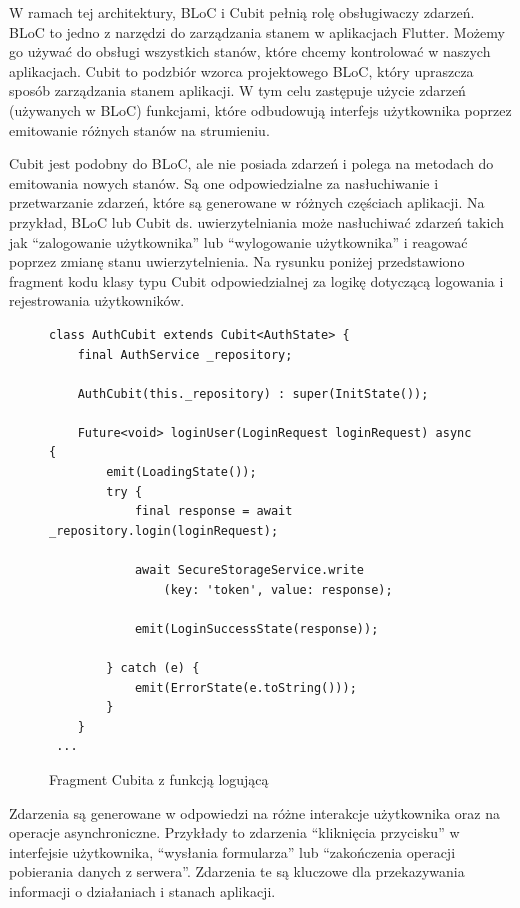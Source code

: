 \documentclass[a4paper,twoside,12pt]{book}
\begin{document}
W ramach tej architektury, BLoC i Cubit pełnią rolę obsługiwaczy zdarzeń.
BLoC to jedno z narzędzi do zarządzania stanem w aplikacjach Flutter. Możemy go używać do obsługi wszystkich stanów, które chcemy kontrolować w naszych aplikacjach. Cubit to podzbiór wzorca projektowego BLoC, który upraszcza sposób zarządzania stanem aplikacji. W tym celu zastępuje użycie zdarzeń (używanych w BLoC) funkcjami, które odbudowują interfejs użytkownika poprzez emitowanie różnych stanów na strumieniu.

Cubit jest podobny do BLoC, ale nie posiada zdarzeń i polega na metodach do emitowania nowych stanów. Są one odpowiedzialne za nasłuchiwanie i przetwarzanie zdarzeń, które są generowane w różnych częściach aplikacji. Na przykład, BLoC lub Cubit ds. uwierzytelniania może nasłuchiwać zdarzeń takich jak ``zalogowanie użytkownika'' lub ``wylogowanie użytkownika'' i reagować poprzez zmianę stanu uwierzytelnienia. Na rysunku poniżej przedstawiono fragment kodu klasy typu Cubit odpowiedzialnej za logikę dotyczącą logowania i rejestrowania użytkowników. 

\begin{figure}[H]
        \begin{lstlisting}
class AuthCubit extends Cubit<AuthState> {
    final AuthService _repository;

    AuthCubit(this._repository) : super(InitState());

    Future<void> loginUser(LoginRequest loginRequest) async {
        emit(LoadingState());
        try {
            final response = await _repository.login(loginRequest);
            
            await SecureStorageService.write
                (key: 'token', value: response);

            emit(LoginSuccessState(response));
            
        } catch (e) {
            emit(ErrorState(e.toString()));
        }
    }
 ...
        \end{lstlisting}
    \caption{Fragment Cubita z funkcją logującą }
    \label{fig:pseudokod:listings}
\end{figure}

Zdarzenia są generowane w odpowiedzi na różne interakcje użytkownika oraz na operacje asynchroniczne. Przykłady to zdarzenia ``kliknięcia przycisku'' w interfejsie użytkownika, ``wysłania formularza'' lub ``zakończenia operacji pobierania danych z serwera''. Zdarzenia te są kluczowe dla przekazywania informacji o działaniach i stanach aplikacji.
\end{document}
